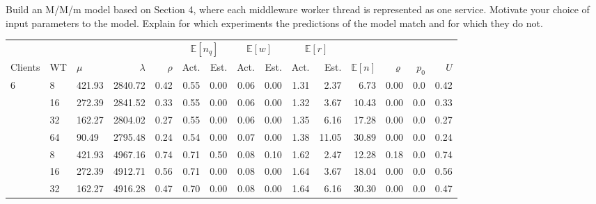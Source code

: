         Build an M/M/m model based on Section 4, where each middleware worker thread is represented as one service.  Motivate your choice of input parameters to the model. Explain for which experiments the predictions of the model match and for which they do not.
        \begin{table}
            \begin{adjustwidth}{-1cm}{}
                \footnotesize{
                    \begin{tabular}{lllrrrrrrrrrrrr}
                        \toprule
                        & & & & & \multicolumn{2}{c}{$\mathbb{E}[n_q]$} & \multicolumn{2}{c}{$\mathbb{E}[w]$} & \multicolumn{2}{c}{$\mathbb{E}[r]$} & &  & & \\
                        \cmidrule(lr){6-7}
                        \cmidrule(lr){8-9}
                        \cmidrule(lr){10-11}
                        Clients & WT & $\mu$      & $\lambda$ & $\rho$ & Act.   & Est.   & Act.  & Est.  & Act.  & Est.  & $\mathbb{E}[n]$ & $\varrho$ & $p_0$ & $U$ \\
                        \midrule
                        6       & 8  & 421.93 & 2840.72   & 0.42   & 0.55   & 0.00   & 0.06  & 0.00  & 1.31  & 2.37  & 6.73            & 0.00      & 0.0   & 0.42 \\
                                & 16 & 272.39 & 2841.52   & 0.33   & 0.55   & 0.00   & 0.06  & 0.00  & 1.32  & 3.67  & 10.43           & 0.00      & 0.0   & 0.33 \\
                                & 32 & 162.27 & 2804.02   & 0.27   & 0.55   & 0.00   & 0.06  & 0.00  & 1.35  & 6.16  & 17.28           & 0.00      & 0.0   & 0.27 \\
                                & 64 & 90.49  & 2795.48   & 0.24   & 0.54   & 0.00   & 0.07  & 0.00  & 1.38  & 11.05 & 30.89           & 0.00      & 0.0   & 0.24 \\
                        \addlinespace
                        12      & 8  & 421.93 & 4967.16   & 0.74   & 0.71   & 0.50   & 0.08  & 0.10  & 1.62  & 2.47  & 12.28           & 0.18      & 0.0   & 0.74 \\
                                & 16 & 272.39 & 4912.71   & 0.56   & 0.71   & 0.00   & 0.08  & 0.00  & 1.64  & 3.67  & 18.04           & 0.00      & 0.0   & 0.56 \\
                                & 32 & 162.27 & 4916.28   & 0.47   & 0.70   & 0.00   & 0.08  & 0.00  & 1.64  & 6.16  & 30.30           & 0.00      & 0.0   & 0.47 \\

\end{tabular}}
\end{adjustwidth}
\end{table}
